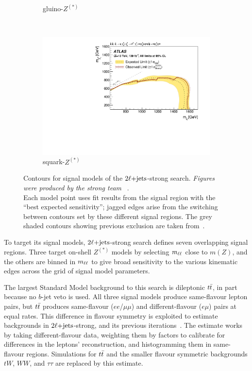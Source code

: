 \begin{figure}[tp]
\begin{subfigure}{0.49\textwidth}
  \caption{gluino-$Z^{(*)}$}
\end{subfigure}
\\[0.5em]
\begin{subfigure}{0.49\textwidth}
  \centering
  \includegraphics[width=\textwidth]{figures/2ljets_strong_contours_squark_z.pdf}
  \caption{squark-$Z^{(*)}$}
\end{subfigure}
\caption{%
Contours for signal models of the $2\ell\mathrm{+jets}$-strong search.
\emph{Figures were produced by the strong team%
}~\cite{atlas2022searches}.
\\[0.5em]
Each model point uses fit results from the signal region with the
``best expected sensitivity'';
jagged edges arise from the switching between contours set by these different
signal regions.
The grey shaded contours showing previous exclusion are taken
from~\cite{atlas_susy_strong_2l_partial_run2}.
}
\label{fig:2ljets_strong_contours}
\end{figure}

To target its signal models, $2\ell\mathrm{+jets}$-strong search defines seven
overlapping signal regions.
Three target on-shell $Z^{(*)}$ models by selecting $m_{\ell\ell}$ close to $m(Z)$,
and the others are binned in $m_{\ell\ell}$ to give broad sensitivity to the various
kinematic edges across the grid of signal model parameters.

The largest Standard Model background to this search is dileptonic $t\bar t$,
in part because no $b$-jet veto is used.
All three signal models produce same-flavour lepton pairs, but $t\bar t$
produces same-flavour ($ee$/$\mu\mu$) and different-flavour ($e\mu$) pairs at
equal rates.
This difference in flavour symmetry is exploited to estimate backgrounds in
$2\ell\mathrm{+jets}$-strong,
and its previous iterations~\cite{cms_susy_2016_strong_2l_run2_1}.
The estimate works by taking different-flavour data, weighting them by factors
to calibrate for differences in the leptons' reconstruction, and histogramming
them in same-flavour regions.
Simulations for $t\bar t$ and the smaller flavour symmetric backgrounds
$tW$, $WW$, and $\tau\tau$ are replaced by this estimate.

